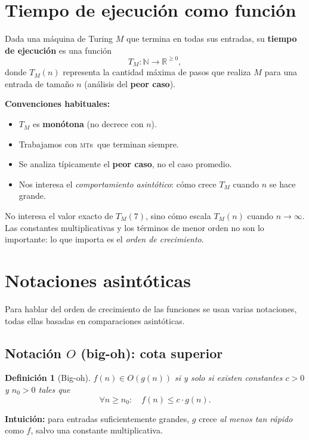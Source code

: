 \documentclass[11pt,a4paper]{article}
\theoremstyle{definicion}
\newtheorem{definicion}{Definición}[section]
\newcommand{\MTs}{\textsc{mt}s}
\newcommand{\N}{\mathbb{N}}
\newcommand{\R}{\mathbb{R}}
\begin{document}
\section{Tiempo de ejecución como función}

Dada una máquina de Turing $M$ que termina en todas sus entradas, su \textbf{tiempo de ejecución} es una función
\[
T_M : \N \to \R^{\geq 0},
\]
donde $T_M(n)$ representa la cantidad máxima de pasos que realiza $M$ para una entrada de tamaño $n$ (análisis del \textbf{peor caso}).

\textbf{Convenciones habituales:}
\begin{itemize}
    \item $T_M$ es \textbf{monótona} (no decrece con $n$).
    \item Trabajamos con \MTs\ que terminan siempre.
    \item Se analiza típicamente el \textbf{peor caso}, no el caso promedio.
    \item Nos interesa el \emph{comportamiento asintótico}: cómo crece $T_M$ cuando $n$ se hace grande.
\end{itemize}

\begin{intuicion}
No interesa el valor exacto de $T_M(7)$, sino cómo escala $T_M(n)$ cuando $n \to \infty$. Las constantes multiplicativas y los términos de menor orden no son lo importante: lo que importa es el \emph{orden de crecimiento}.
\end{intuicion}

\section{Notaciones asintóticas}

Para hablar del orden de crecimiento de las funciones se usan varias notaciones, todas ellas basadas en comparaciones asintóticas.

\subsection{Notación $O$ (big-oh): cota superior}

\begin{definicion}[Big-oh]
$f(n) \in O(g(n))$ si y solo si existen constantes $c > 0$ y $n_0 > 0$ tales que
\[
\forall n \geq n_0 : \quad f(n) \leq c \cdot g(n).
\]
\end{definicion}

\textbf{Intuición:} para entradas suficientemente grandes, $g$ crece \emph{al menos tan rápido} como $f$, salvo una constante multiplicativa.
\end{document}
